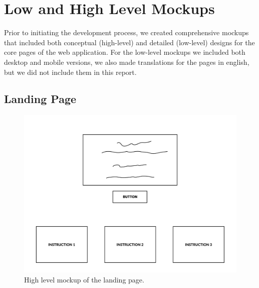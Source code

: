\documentclass[10pt]{article}
\begin{document}
\clearpage

\section{Low and High Level Mockups}

Prior to initiating the development process, we created comprehensive mockups that included both conceptual (high-level) and detailed (low-level) designs for the core pages of the web application. For the low-level mockups we included both desktop and mobile versions, we also made translations for the pages in english, but we did not include them in this report.

\subsection{Landing Page}

\begin{figure}[H]
  \centering
  \includegraphics[width=0.9\linewidth]{report-images/landing-page-high-level.png}
  \caption{High level mockup of the landing page.}
  \label{fig:fig-7}
\end{figure}
\end{document}
